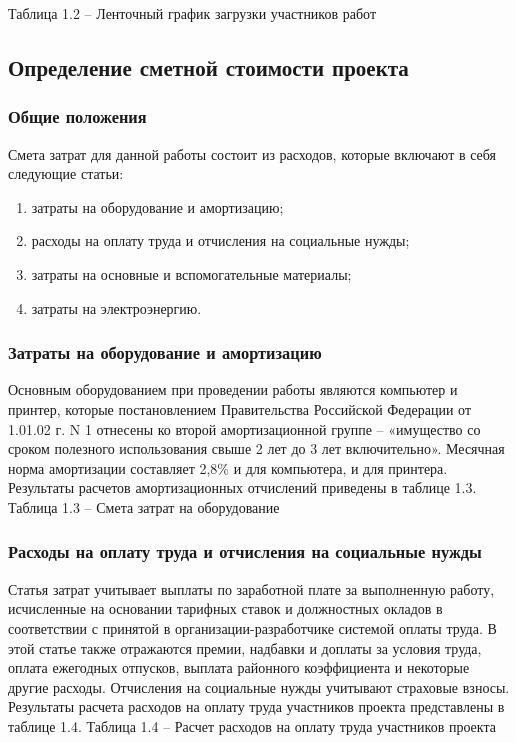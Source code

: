 Таблица 1.2 – Ленточный график загрузки участников работ

\subsection{Определение сметной стоимости проекта}
\subsubsection{Общие положения}
Смета затрат для данной работы состоит из расходов, которые включают в себя следующие статьи:
\begin{enumerate}
\item затраты на оборудование и амортизацию;
\item расходы на оплату труда и отчисления на социальные нужды;
\item затраты на основные и вспомогательные материалы;
\item затраты на электроэнергию.
\end{enumerate}
\subsubsection{Затраты на оборудование и амортизацию}
Основным оборудованием при проведении работы являются компьютер и принтер, которые постановлением Правительства Российской Федерации от 1.01.02 г. N 1 отнесены ко второй амортизационной группе – «имущество со сроком полезного использования свыше 2 лет до 3 лет включительно». Месячная норма амортизации составляет 2,8\% и для компьютера, и для принтера.
Результаты расчетов амортизационных отчислений приведены в таблице 1.3.
Таблица 1.3 – Смета затрат на оборудование
\subsubsection{Расходы на оплату труда и отчисления на социальные нужды}
Статья затрат учитывает выплаты по заработной плате за выполненную работу, исчисленные на основании тарифных ставок и должностных окладов в соответствии с принятой в организации-разработчике системой оплаты труда. В этой статье также отражаются премии, надбавки и доплаты за условия труда, оплата ежегодных отпусков, выплата районного коэффициента и некоторые другие расходы. Отчисления на социальные нужды учитывают страховые взносы.
Результаты расчета расходов на оплату труда участников проекта представлены в таблице 1.4.
Таблица 1.4 – Расчет расходов на оплату труда участников проекта
